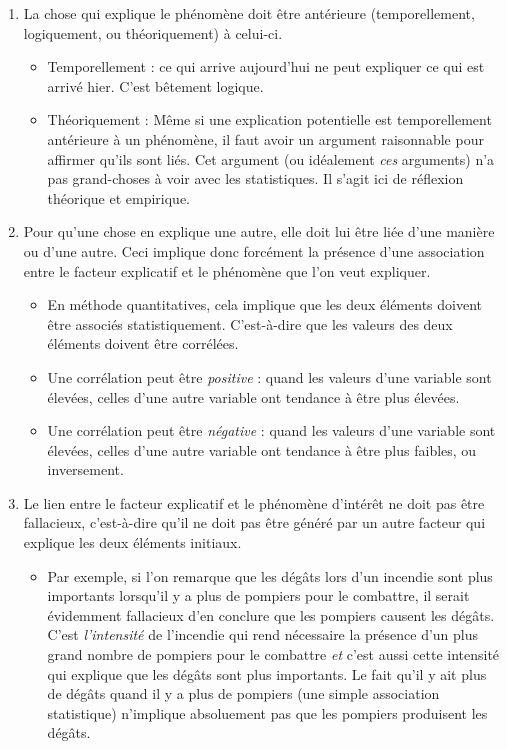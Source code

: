 \documentclass[
]{book}
\providecommand{\tightlist}{%
  \setlength{\itemsep}{0pt}\setlength{\parskip}{0pt}}
\begin{document}
\begin{enumerate}
\def\labelenumi{\arabic{enumi}.}
\tightlist
\item
  La chose qui explique le phénomène doit être antérieure (temporellement, logiquement, ou théoriquement) à celui-ci.

  \begin{itemize}
  \tightlist
  \item
    Temporellement : ce qui arrive aujourd'hui ne peut expliquer ce qui est arrivé hier. C'est bêtement logique.
  \item
    Théoriquement : Même si une explication potentielle est temporellement antérieure à un phénomène, il faut avoir un argument raisonnable pour affirmer qu'ils sont liés. Cet argument (ou idéalement \emph{ces} arguments) n'a pas grand-choses à voir avec les statistiques. Il s'agit ici de réflexion théorique et empirique.
  \end{itemize}
\item
  Pour qu'une chose en explique une autre, elle doit lui être liée d'une manière ou d'une autre. Ceci implique donc forcément la présence d'une association entre le facteur explicatif et le phénomène que l'on veut expliquer.

  \begin{itemize}
  \tightlist
  \item
    En méthode quantitatives, cela implique que les deux éléments doivent être associés statistiquement. C'est-à-dire que les valeurs des deux éléments doivent être corrélées.
  \item
    Une corrélation peut être \emph{positive} : quand les valeurs d'une variable sont élevées, celles d'une autre variable ont tendance à être plus élevées.
  \item
    Une corrélation peut être \emph{négative} : quand les valeurs d'une variable sont élevées, celles d'une autre variable ont tendance à être plus faibles, ou inversement.
  \end{itemize}
\item
  Le lien entre le facteur explicatif et le phénomène d'intérêt ne doit pas être fallacieux, c'est-à-dire qu'il ne doit pas être généré par un autre facteur qui explique les deux éléments initiaux.

  \begin{itemize}
  \tightlist
  \item
    Par exemple, si l'on remarque que les dégâts lors d'un incendie sont plus importants lorsqu'il y a plus de pompiers pour le combattre, il serait évidemment fallacieux d'en conclure que les pompiers causent les dégâts. C'est \emph{l'intensité} de l'incendie qui rend nécessaire la présence d'un plus grand nombre de pompiers pour le combattre \emph{et} c'est aussi cette intensité qui explique que les dégâts sont plus importants. Le fait qu'il y ait plus de dégâts quand il y a plus de pompiers (une simple association statistique) n'implique absoluement pas que les pompiers produisent les dégâts.
  \end{itemize}
\end{enumerate}
\end{document}
